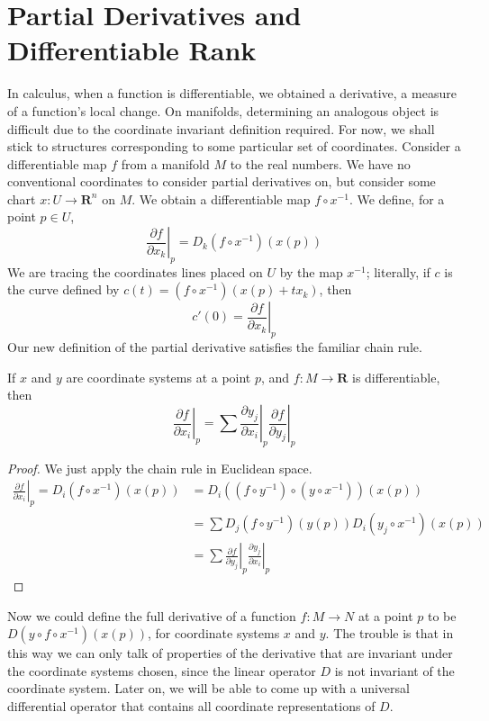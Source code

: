 \section{Partial Derivatives and Differentiable Rank}

In calculus, when a function is differentiable, we obtained a derivative, a measure of a function's local change. On manifolds, determining an analogous object is difficult due to the coordinate invariant definition required. For now, we shall stick to structures corresponding to some particular set of coordinates. Consider a differentiable map $f$ from a manifold $M$ to the real numbers. We have no conventional coordinates to consider partial derivatives on, but consider some chart $x:U \to \mathbf{R}^n$ on $M$. We obtain a differentiable map $f \circ x^{-1}$. We define, for a point $p \in U$,
%
\[ \left. \frac{\partial f}{\partial x_k} \right|_p = D_k(f \circ x^{-1})(x(p)) \]
%
We are tracing the coordinates lines placed on $U$ by the map $x^{-1}$; literally, if $c$ is the curve defined by $c(t) = (f \circ x^{-1})(x(p) + tx_k)$, then
%
\[ c'(0) = \left.\frac{\partial f}{\partial x_k}\right|_p \]
%
Our new definition of the partial derivative satisfies the familiar chain rule.

\begin{theorem}
    If $x$ and $y$ are coordinate systems at a point $p$, and $f:M \to \mathbf{R}$ is differentiable, then
    \[ \left. \frac{\partial f}{\partial x_i} \right|_p = \sum \left. \frac{\partial y_j}{\partial x_i} \right|_p \left. \frac{\partial f}{\partial y_j} \right|_p \]
\end{theorem}
\begin{proof}
    We just apply the chain rule in Euclidean space.
    \begin{align*}
        \left.\frac{\partial f}{\partial x_i}\right|_p = D_i(f \circ x^{-1})(x(p)) &= D_i((f \circ y^{-1}) \circ (y \circ x^{-1}))(x(p))\\
        &= \sum D_j(f \circ y^{-1})(y(p)) D_i(y_j \circ x^{-1})(x(p))\\
        &= \sum \left.\frac{\partial f}{\partial y_j}\right|_p \left.\frac{\partial y_j}{\partial x_i}\right|_p
    \end{align*}
\end{proof}

Now we could define the full derivative of a function $f:M \to N$ at a point $p$ to be $D(y \circ f \circ x^{-1})(x(p))$, for coordinate systems $x$ and $y$. The trouble is that in this way we can only talk of properties of the derivative that are invariant under the coordinate systems chosen, since the linear operator $D$ is not invariant of the coordinate system. Later on, we will be able to come up with a universal differential operator that contains all coordinate representations of $D$.

